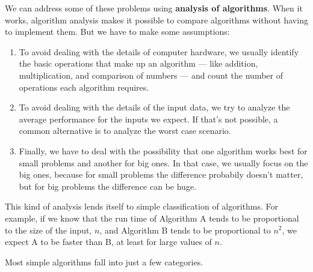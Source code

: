 \documentclass[12pt]{book}
\theoremstyle{exercise}
\newcommand{\java}{\verb}%}
\begin{document}
We can address some of these problems using {\bf analysis of
  algorithms}. When it works, algorithm analysis makes it possible to compare
algorithms without having to implement them. But we have to make some
assumptions:

\begin{enumerate}

\item
  To avoid dealing with the details of computer hardware, we usually
  identify the basic operations that make up an algorithm --- like
  addition, multiplication, and comparison of numbers --- and count the
  number of operations each algorithm requires.

\item
  To avoid dealing with the details of the input data, we try to analyze
  the average performance for the inputs we expect. If that's not
  possible, a common alternative is to analyze the worst case scenario.

\item
  Finally, we have to deal with the possibility that one algorithm works
  best for small problems and another for big ones. In that case, we
  usually focus on the big ones, because for small problems the difference
  probabily doesn't matter, but for big problems the difference can
  be huge.

\end{enumerate}

This kind of analysis lends itself to simple classification of
algorithms. For example, if we know that the run time of Algorithm A
tends to be proportional to the size of the input, $n$,
and Algorithm B tends to be proportional to $n^2$, we
expect A to be faster than B, at least for large values of $n$.

Most simple algorithms fall into just a few categories.

\end{document}
